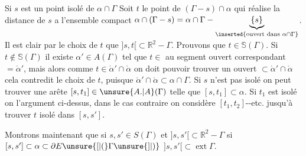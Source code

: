 Si $s$ est un point isolé de $\alpha\cap\Gamma$ Soit $t$ le point de $(\Gamma-s)\cap\alpha$ qui réalise la distance de $s$ a l'ensemble compact $\alpha\cap(\Gamma-s)=\alpha\cap\Gamma-\underbrace{\{s\}}_{\inserted{\text{ouvert dans }\alpha\cap\Gamma}}$. Il est clair par le choix de $t$ que $]s,t[\subset\mathbb{R}^{2}-\Gamma$. Prouvons que $t\in\mathbb{S}(\Gamma)$. Si $t\notin\mathbb{S}(\Gamma)$ il existe $\alpha'\in A(\Gamma)$ tel que $t\in$ au segment ouvert correspondant $=\mathring{\alpha}'$, mais alors comme $t\in\mathring{\alpha}'\cap\mathring{\alpha}$ on doit pouvoir trouver un ouvert $\subset\mathring{\alpha}'\cap\mathring{\alpha}$  cela contredit le choix de $t$, puisque $\mathring{\alpha}'\cap\mathring{\alpha}\subset\alpha\cap\Gamma$. Si $s$ n'est pas isolé on peut trouver une arête $[s,t_1]\in\unsure{A.|A}(\Gamma)$ telle que $[s,t_1]\subset\alpha$. Si $t_1$ est isolé on  l'argument ci-dessus, dans le cas contraire on considère $[t_1,t_2]$-{}-etc. jusqu'à trouver $t$ isolé dans $[s,s']$.

Montrons maintenant que si $s,s'\in S(\Gamma)$ et $]s,s'[\subset\mathbb{R}^{2}-\Gamma$ si $[s,s']\subset\alpha\subset\partial E\unsure{[|(}\Gamma\unsure{]|)}$ $]s,s'[\subset\operatorname{ext}\Gamma$.
